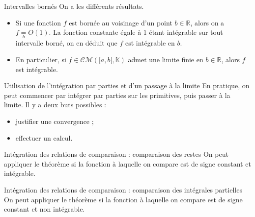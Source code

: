 \documentclass[french]{book}
\newcommand{\R}{\mathbb{R}}
\newcommand{\K}{\mathbb{K}}
\theoremstyle{plain}
\theoremstyle{definition}
\theoremstyle{remark}
\begin{document}
\begin{PM}{Intervalles bornés} On a les différents résultats.
\begin{itemize}
	\item Si une fonction $f$ est bornée au voisinage d'un point $b\in\R$, alors on a $f\underset{b}{=}O(1)$. La fonction constante égale à $1$ étant intégrable sur tout intervalle borné, on en déduit que $f$ est intégrable en $b$.
	\item En particulier, si $f\in\mathcal{CM}([a,b[,\K)$ admet une limite finie en $b\in\R$, alors $f$ est intégrable.
\end{itemize}
\end{PM}
\begin{PM}{Utilisation de l'intégration par parties et d'un passage à la limite} En pratique, on peut commencer par intégrer par parties sur les primitives, puis passer à la limite. Il y a deux buts possibles :
\begin{itemize}
	\item justifier une convergence ;
	\item effectuer un calcul.
\end{itemize}
\end{PM}
\begin{PM}{Intégration des relations de comparaison : comparaison des restes} On peut appliquer le théorème si la fonction à laquelle on compare est de signe constant et intégrable.
\end{PM}
\begin{PM}{Intégration des relations de comparaison : comparaison des intégrales partielles} On peut appliquer le théorème si la fonction à laquelle on compare est de signe constant et non intégrable.
\end{PM}
\end{document}
